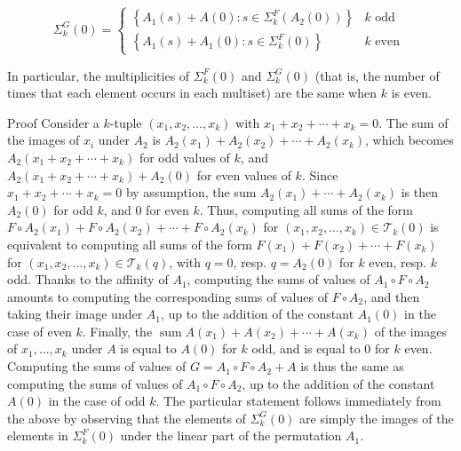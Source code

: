 \documentclass[10pt]{article}
\begin{document}
$$
\Sigma_{k}^{G}(0)= \begin{cases}\left\{A_{1}(s)+A(0): s \in \Sigma_{k}^{F}\left(A_{2}(0)\right)\right\} & k \text { odd } \\ \left\{A_{1}(s)+A_{1}(0): s \in \Sigma_{k}^{F}(0)\right\} & k \text { even }\end{cases}
$$

In particular, the multiplicities of $\Sigma_{k}^{F}(0)$ and $\Sigma_{k}^{G}(0)$ (that is, the number of times that each element occurs in each multiset) are the same when $k$ is even.

Proof Consider a $k$-tuple $\left(x_{1}, x_{2}, \ldots, x_{k}\right)$ with $x_{1}+x_{2}+\cdots+x_{k}=0$. The sum of the images of $x_{i}$ under $A_{2}$ is $A_{2}\left(x_{1}\right)+A_{2}\left(x_{2}\right)+\cdots+A_{2}\left(x_{k}\right)$, which becomes $A_{2}\left(x_{1}+x_{2}+\cdots+x_{k}\right)$ for odd values of $k$, and $A_{2}\left(x_{1}+x_{2}+\cdots+x_{k}\right)+A_{2}(0)$ for even values of $k$. Since $x_{1}+x_{2}+\cdots+x_{k}=0$ by assumption, the sum $A_{2}\left(x_{1}\right)+\cdots+A_{2}\left(x_{k}\right)$ is then $A_{2}(0)$ for odd $k$, and 0 for even $k$. Thus, computing all sums of the form $F \circ A_{2}\left(x_{1}\right)+F \circ A_{2}\left(x_{2}\right)+\cdots+ F \circ A_{2}\left(x_{k}\right)$ for $\left(x_{1}, x_{2}, \ldots, x_{k}\right) \in \mathcal{T}_{k}(0)$ is equivalent to computing all sums of the form $F\left(x_{1}\right)+F\left(x_{2}\right)+\cdots+F\left(x_{k}\right)$ for $\left(x_{1}, x_{2}, \ldots, x_{k}\right) \in \mathcal{T}_{k}(q)$, with $q=0$, resp. $q=A_{2}(0)$ for $k$ even, resp. $k$ odd. Thanks to the affinity of $A_{1}$, computing the sums of values of $A_{1} \circ F \circ A_{2}$ amounts to computing the corresponding sums of values of $F \circ A_{2}$, and then taking their image under $A_{1}$, up to the addition of the constant $A_{1}(0)$ in the case of even $k$. Finally, the $\operatorname{sum} A\left(x_{1}\right)+A\left(x_{2}\right)+\cdots+A\left(x_{k}\right)$ of the images of $x_{1}, \ldots, x_{k}$ under $A$ is equal to $A(0)$ for $k$ odd, and is equal to 0 for $k$ even. Computing the sums of values of $G=A_{1} \circ F \circ A_{2}+A$ is thus the same as computing the sums of values of $A_{1} \circ F \circ A_{2}$, up to the addition of the constant $A(0)$ in the case of odd $k$. The particular statement follows immediately from the above by observing that the elements of $\Sigma_{k}^{G}(0)$ are simply the images of the elements in $\Sigma_{k}^{F}(0)$ under the linear part of the permutation $A_{1}$.
\end{document}
